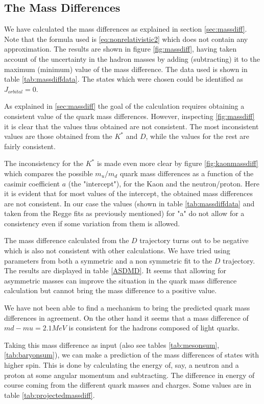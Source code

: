 \documentclass[11pt,a4paper]{article}
\begin{document}
\FloatBarrier
\subsection{The Mass Differences}
\label{sec:confrontmassdiff}
We have calculated the mass differences as explained in section \ref{sec:massdiff}. Note that the formula used is \ref{eq:nonrelativistic2} which does not contain any approximation. The results are shown in figure \ref{fig:massdiff}, having taken account of the uncertainty in the hadron masses by adding (subtracting) it to the maximum (minimum) value of the mass difference.  The data used is shown in table \ref{tab:massdiffdata}. The states which were chosen could be identified as $J_{orbital}=0$.

As explained in \ref{sec:massdiff} the goal of the calculation requires obtaining a consistent value of the quark mass differences. However, inspecting \ref{fig:massdiff} it is clear that the values thus obtained are not consistent. The most inconsistent values are those obtained from the $K^{*}$ and $D$, while the values for the rest are fairly consistent. 

The inconsistency for the $K^{*}$ is made even more clear by figure \ref{fig:kaonmassdiff} which compares the possible $m_u/m_d$ quark mass differences as a function of the casimir coefficient $a$ (the "intercept"), for the Kaon and the neutron/proton. Here it is evident that for most values of the intercept, the obtained mass differences are not consistent. In our case the values (shown in table \ref{tab:massdiffdata} and taken from the Regge fits as previously mentioned) for "a" do not allow for a consistency even if some variation from them is allowed.

The mass difference calculated from the $D$ trajectory turns out to be negative which is also not consistent with other calculations. We have tried using parameters from both a symmetric and a non symmetric fit to the $D$ trajectory. The results are displayed in table \ref{ASDMD}. It seems that allowing for asymmetric masses can improve the situation in the quark mass difference calculation but cannot bring the mass difference to a positive value.

We have not been able to find a mechanism to bring the predicted quark mass differences in agreement. On the other hand it seems that a mass difference of $md-mu=2.1 MeV$ is consistent for the hadrons composed of light quarks.

Taking this mass difference as input (also see tables \ref{tab:mesonsum},\ref{tab:baryonsum}), we can make a prediction of the mass differences of states with higher spin. This is done by calculating the energy of, say, a neutron and a proton at some angular momentum and subtracting. The difference in energy of course coming from the different quark masses and charges. Some values are in table \ref{tab:projectedmassdiff}.
\end{document}
